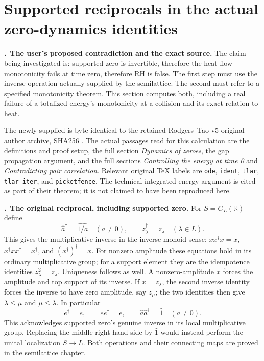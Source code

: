 \documentclass[11pt,a4paper]{article}
\theoremstyle{definition}\newtheorem{definition}[theorem]{Definition}
\begin{document}
\section{Supported reciprocals in the actual zero-dynamics identities}
\label{sec:rd}
\newcommand{\RD}{\par\medskip\noindent\textbf{\therd.}\ }

\RD\textbf{The user's proposed contradiction and the exact source.}
The claim being investigated is: supported zero is invertible, therefore
the heat-flow monotonicity fails at time zero, therefore RH is false.
The first step must use the inverse operation actually supplied by the
semilattice. The second must refer to a specified monotonicity theorem.
This section computes both, including a real failure of a totalized
energy's monotonicity at a collision and its exact relation to heat.

The newly supplied  is byte-identical
to the retained Rodgers--Tao v5 original-author archive, SHA256
.
The actual passages read for this calculation are the definitions and
proof setup, the full section \emph{Dynamics of zeroes}, the gap
propagation argument, and the full sections \emph{Controlling the energy
at time 0} and \emph{Contradicting pair correlation}. Relevant original
TeX labels are \texttt{ode}, \texttt{ident}, \texttt{tlar},
\texttt{tlar-iter}, and \texttt{picketfence}. The technical integrated
energy argument is cited as part of their theorem; it is not claimed
to have been reproduced here.

\RD\textbf{The original reciprocal, including supported zero.}
For $S=G_L(\mathbb R)$ define
\[
 \widehat a^{\dagger}=\widehat{1/a}\quad(a\ne0),
 \qquad z_\lambda^{\dagger}=z_\lambda\quad(\lambda\in L).
\]
This gives the multiplicative inverse in the inverse-monoid sense:
$xx^\dagger x=x$, $x^\dagger xx^\dagger=x^\dagger$, and
$(x^\dagger)^\dagger=x$. For nonzero amplitude these equations hold
in its ordinary multiplicative group; for a support element they are
the idempotence identities $z_\lambda^2=z_\lambda$. Uniqueness follows
as well. A nonzero-amplitude $x$ forces the amplitude and top support
of its inverse. If $x=z_\lambda$, the second inverse identity forces
the inverse to have zero amplitude, say $z_\mu$; the two identities
then give $\lambda\le\mu$ and $\mu\le\lambda$.
In particular
\[
 e^\dagger=e,\qquad ee^\dagger=e,\qquad
 \widehat a\widehat a^\dagger=\widehat1\quad(a\ne0).
\]
This acknowledges supported zero's genuine inverse in its local
multiplicative group. Replacing the middle right-hand side by
$\widehat1$ would instead perform the unital localization $S\to L$.
Both operations and their connecting maps are proved in the
semilattice chapter.
\end{document}

